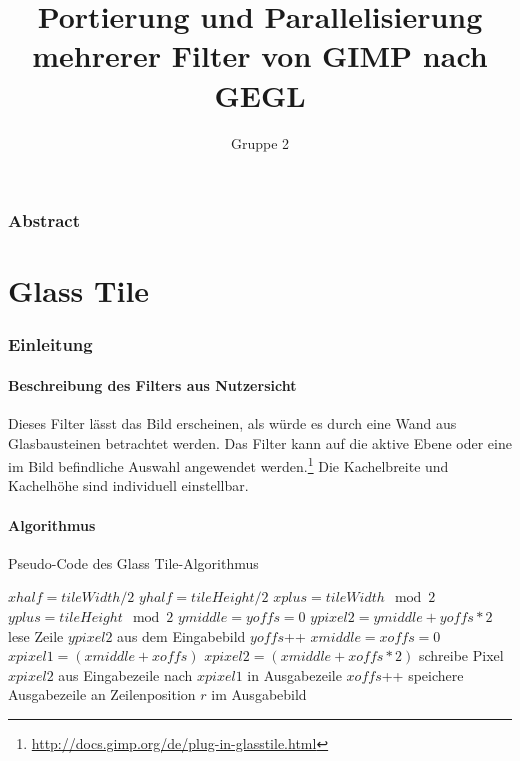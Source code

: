 \documentclass[10pt,a4paper]{article}
\begin{document}
\author{Gruppe 2}
\title{Portierung und Parallelisierung mehrerer Filter von GIMP nach GEGL}
\maketitle

\section*{Abstract}

\part{Glass Tile}

\section{Einleitung}
 
\subsection{Beschreibung des Filters aus Nutzersicht}
Dieses Filter lässt das Bild erscheinen, als würde es durch eine Wand aus Glasbausteinen betrachtet werden. Das Filter kann auf die aktive Ebene oder eine im Bild befindliche Auswahl angewendet werden.\footnote{\url{http://docs.gimp.org/de/plug-in-glasstile.html}} Die Kachelbreite und Kachelhöhe sind individuell einstellbar.
\subsection{Algorithmus} 
\begin{algorithm}[h]
\caption{Pseudo-Code des \glqq Glass Tile\grqq-Algorithmus}
\label{algo:gtile}
\begin{algorithmic}[1]
\State $xhalf = tileWidth  / 2$
\State $yhalf = tileHeight / 2$
\State $xplus = tileWidth  \mod 2$
\State $yplus = tileHeight \mod 2$
\State $ymiddle = yoffs = 0$
	\State $ypixel2 = ymiddle + yoffs * 2$
	\State lese Zeile $ypixel2$ aus dem Eingabebild
	\State $yoffs$++
	\EndIf
	\State $xmiddle = xoffs = 0$
		\State $xpixel1 = (xmiddle + xoffs)$
		\State $xpixel2 = (xmiddle + xoffs * 2)$
		\State schreibe Pixel $xpixel2$ aus Eingabezeile nach $xpixel1$ in Ausgabezeile
		\State $xoffs$++
		\EndIf
	\EndFor
	\State speichere Ausgabezeile an Zeilenposition $r$ im Ausgabebild
\EndFor	
\end{algorithmic}
\end{algorithm}
\end{document}
